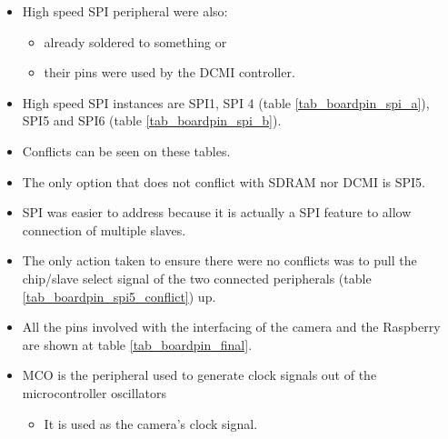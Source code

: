 

\begin{itemize}
	\item High speed SPI peripheral were also:
	\begin{itemize}
		\item already soldered to something or
		\item their pins were used by the DCMI controller.
	\end{itemize}
	\item High speed SPI instances are SPI1, SPI 4 (table \ref{tab_boardpin_spi_a}), SPI5 and SPI6 (table \ref{tab_boardpin_spi_b}).
	\item Conflicts can be seen on these tables.
	\item The only option that does not conflict with SDRAM nor DCMI is SPI5.
\end{itemize}





\begin{itemize}
	\item SPI was easier to address because it is actually a SPI feature to allow connection of multiple slaves. 
	\item The only action taken to ensure there were no conflicts was to pull the chip/slave select signal of the two connected peripherals (table \ref{tab_boardpin_spi5_conflict}) up.
\end{itemize}



\begin{itemize}
	\item All the pins involved with the interfacing of the camera and the Raspberry are shown at table \ref{tab_boardpin_final}. 
	\item MCO is the peripheral used to generate clock signals out of the microcontroller oscillators
	\begin{itemize}
		\item It is used as the camera's clock signal.
	\end{itemize}
\end{itemize}



